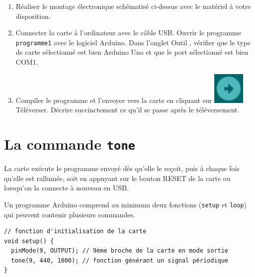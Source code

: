 \documentclass[12pt,a4paper]{article}
\newcommand{\ritem}{\refstepcounter{enumi}\item[\color{bleu_f}\textbf{\theenumi .}]}
\begin{document}
\begin{enumerate}[resume]
\item \rea{}

Réaliser le montage électronique schématisé ci-dessus avec le matériel à votre disposition.

\item \rea{}

Connecter la carte à l'ordinateur avec le câble USB.
Ouvrir le programme \texttt{programme1} avec le logiciel Arduino.
Dans l'onglet \og Outil \fg{}, vérifier que le type de carte sélectionné est bien Arduino Uno et que le port sélectionné est bien COM1.

\ritem \rea{} \com{}

Compiler le programme et l'envoyer vers la carte en cliquant sur \includegraphics[height=0.75\baselineskip]{images/arduino_televerser.png} Téléverser.
Décrire succinctement ce qu'il se passe après le téléversement.

\end{enumerate}

\section*{La commande \texttt{tone}}

La carte exécute le programme envoyé dès qu'elle le reçoit, puis à chaque fois qu'elle est rallumée, soit en appuyant sur le bouton RESET de la carte ou lorsqu'on la connecte à nouveau en USB.

Un programme Arduino comprend au minimum deux fonctions (\texttt{setup} et \texttt{loop}) qui peuvent contenir plusieurs commandes.

\begin{lstlisting}[style=Arduino]
// fonction d'initialisation de la carte
void setup() {
  pinMode(9, OUTPUT); // 9ème broche de la carte en mode sortie
  tone(9, 440, 1000); // fonction générant un signal périodique
}
\end{lstlisting}
\end{document}
